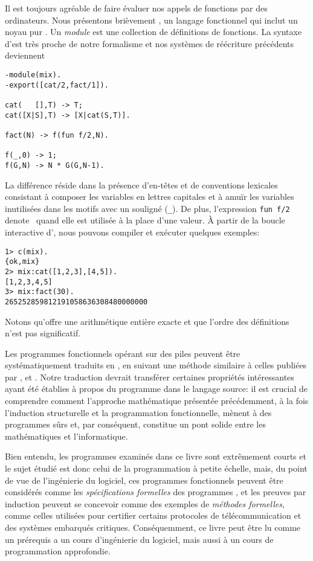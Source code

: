 Il est toujours agréable de faire évaluer nos appels de fonctions par
des ordinateurs. Nous présentons brièvement \Erlang, un langage
fonctionnel qui inclut un noyau pur \citep{Armstrong_2007}.  Un
\emph{module} est une collection de définitions de fonctions. La
syntaxe d'\Erlang est très proche de notre formalisme et nos systèmes
de réécriture précédents deviennent
\begin{verbatim}
-module(mix).
-export([cat/2,fact/1]).

cat(   [],T) -> T;
cat([X|S],T) -> [X|cat(S,T)].

fact(N) -> f(fun f/2,N).

f(_,0) -> 1;
f(G,N) -> N * G(G,N-1).
\end{verbatim}
La différence réside dans la présence d'en-têtes et de conventions
lexicales consistant à composer les variables en lettres capitales et
à amuïr les variables inutilisées dans les motifs avec un souligné
(\verb|_|). De plus, l'expression \verb|fun f/2| denote~
quand elle est utilisée à la place d'une valeur. À partir de la boucle
interactive d'\Erlang, nous pouvons compiler et exécuter quelques
exemples:
\begin{verbatim}
1> c(mix).
{ok,mix}
2> mix:cat([1,2,3],[4,5]).
[1,2,3,4,5]
3> mix:fact(30).
265252859812191058636308480000000
\end{verbatim}
Notons qu'\Erlang offre une arithmétique entière exacte et que l'ordre
des définitions n'est pas significatif.

\label{par:java}

Les programmes fonctionnels opérant sur des piles peuvent être
systématiquement traduits en \Java, en suivant une méthode similaire à
celles publiées par \cite{FelleisenFriedman_1997}, \cite{Bloch_2003}
et \cite{Sher_2004}. Notre traduction devrait transférer certaines
propriétés intéressantes ayant été établies à propos du programme dans
le langage source: il est crucial de comprendre comment l'approche
mathématique présentée précédemment, à la fois l'induction
structurelle et la programmation fonctionnelle, mènent à des
programmes \Java sûrs et, par conséquent, constitue un pont solide
entre les mathématiques et l'informatique.

Bien entendu, les programmes examinés dans ce livre sont extrêmement
courts et le sujet étudié est donc celui de la programmation à petite
échelle, mais, du point de vue de l'ingénierie du logiciel, ces
programmes fonctionnels peuvent être considérés comme les
\emph{spécifications formelles} des programmes \Java, et les preuves
par induction peuvent se concevoir comme des exemples de
\emph{méthodes formelles}, comme celles utilisées pour certifier
certains protocoles de télécommunication et des systèmes embarqués
critiques. Conséquemment, ce livre peut être lu comme un prérequis a
un cours d'ingénierie du logiciel, mais aussi à un cours de
programmation approfondie.

